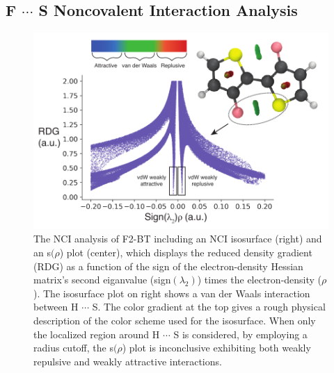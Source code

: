 \subsection{\texorpdfstring{F $\cdots$ S}{FSN} Noncovalent Interaction Analysis}
\begin{figure}[hbt!]
    \centering
    \includegraphics{figures/append_aroma/pt_f2_nciplot_copy.pdf}
    \caption[\texorpdfstring{F $\cdots$ S}{FS} NCI Analysis]{The NCI analysis of F2-BT including an NCI isosurface (right) and an s$(\rho$) plot (center), which displays the reduced density gradient (RDG) as a function of the sign of the electron-density Hessian matrix's second eiganvalue (sign$(\lambda_{2})$) times the electron-density ($\rho$). The isosurface plot on right shows a van der Waals interaction between H $\cdots$ S. The color gradient at the top gives a rough physical description of the color scheme used for the isosurface. When only the localized region around H $\cdots$ S is considered, by employing a radius cutoff, the s$(\rho$) plot is inconclusive exhibiting both weakly repulsive and weakly attractive interactions.}
    \label{fig:pt_f2_nci}
\end{figure}
\clearpage

